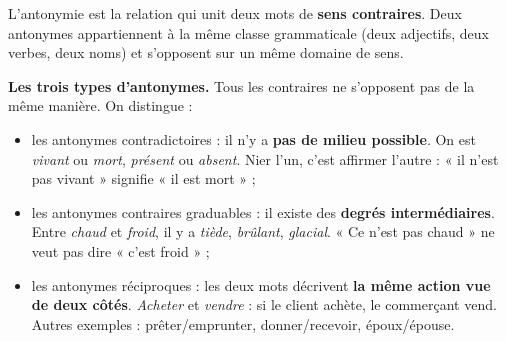 \documentclass[11pt]{article}
\newcommand{\cle}[1]{{\popxbold\color{popdark}#1}}
\begin{document}
\begin{definition}[L'antonymie]
L'\cle{antonymie} est la relation qui unit deux mots de \textbf{sens contraires}. Deux antonymes appartiennent à la même classe grammaticale (deux adjectifs, deux verbes, deux noms) et s'opposent sur un même domaine de sens.
\end{definition}

\textbf{Les trois types d'antonymes.} Tous les contraires ne s'opposent pas de la même manière. On distingue :

\begin{itemize}
\item les antonymes \cle{contradictoires} : il n'y a \textbf{pas de milieu possible}. On est \emph{vivant} ou \emph{mort}, \emph{présent} ou \emph{absent}. Nier l'un, c'est affirmer l'autre : « il n'est pas vivant » signifie « il est mort » ;
\item les antonymes \cle{contraires graduables} : il existe des \textbf{degrés intermédiaires}. Entre \emph{chaud} et \emph{froid}, il y a \emph{tiède}, \emph{brûlant}, \emph{glacial}. « Ce n'est pas chaud » ne veut pas dire « c'est froid » ;
\item les antonymes \cle{réciproques} : les deux mots décrivent \textbf{la même action vue de deux côtés}. \emph{Acheter} et \emph{vendre} : si le client achète, le commerçant vend. Autres exemples : prêter/emprunter, donner/recevoir, époux/épouse.
\end{itemize}
\end{document}
